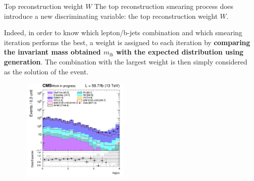 \documentclass[8pt]{beamer}
\begin{document}
\begin{frame}{Top reconstruction weight $W$}
\justifying
The top reconstruction smearing process does introduce a new discriminating variable: the \alert{top reconstruction weight $W$}. \vfill

Indeed, in order to know which lepton/b-jets combination and which smearing iteration performs the best, a weight is assigned to each iteration by \textbf{comparing the invariant mass obtained $m_{lb}$ with the expected distribution using generation}. The combination with the largest weight is then simply considered as the solution of the event. \vfill

\begin{figure}[htbp]
\centering
\begin{minipage}[b]{.99\textwidth}
\begin{center}
\includegraphics[width=5.5cm, height=5cm]{figs/2018/SmearSR-ttDM-scalar100/log_cratio_topCR_ll_reco_weight.png}
\end{center}
\end{minipage}\hfill
\label{fig:SRdiscmblt}
\end{figure}
\end{frame}
\end{document}
